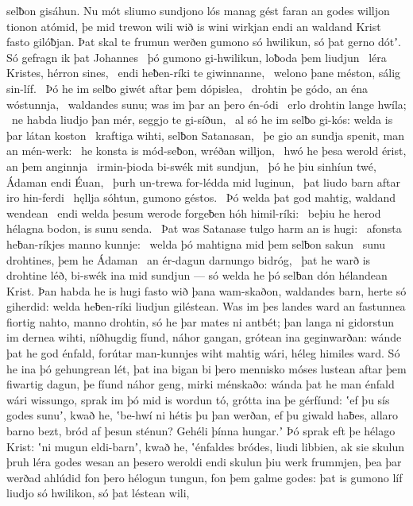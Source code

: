 selƀon gisáhun. Nu mót sliumo sundjono lós
manag gést faran an godes willjon
tionon atómid, þe mid trewon wili
wið is wini wirkjan endi an waldand Krist
fasto gilóƀjan. Þat skal te frumun werðen
gumono só hwilikun, só þat gerno dótʼ.
Só gefragn ik þat Johannes \hld\ þó gumono gi-hwilikun,
loƀoda þem liudjun \hld\ léra Kristes,
hérron sines, \hld\ endi heƀen-ríki
te giwinnanne, \hld\ welono þane méston,
sálig sin-líf. \hld\ Þó he im selƀo giwét
aftar þem dópislea, \hld\ drohtin þe gódo,
an éna wóstunnja, \hld\ waldandes sunu;
was im þar an þero én-ódi \hld\ erlo drohtin
lange hwíla; \hld\ ne habda liudjo þan mér,
seggjo te gi-síðun, \hld\ al só he im selƀo gi-kós:
welda is þar látan koston \hld\ kraftiga wihti,
selƀon Satanasan, \hld\ þe gio an sundja spenit,
man an mén-werk: \hld\ he konsta is mód-seƀon,
wréðan willjon, \hld\ hwó he þesa werold érist,
an þem anginnja \hld\ irmin-þioda
bi-swék mit sundjun, \hld\ þó he þiu sinhíun twé,
Ádaman endi Éuan, \hld\ þurh un-trewa
for-lédda mid luginun, \hld\ þat liudo barn
aftar iro hin-ferdi \hld\ hęllja sóhtun,
gumono géstos. \hld\ Þó welda þat god mahtig,
waldand wendean \hld\ endi welda þesum werode forgeƀen
hóh himil-ríki: \hld\ beþiu he herod hélagna bodon,
is sunu senda. \hld\ Þat was Satanase
tulgo harm an is hugi: \hld\ afonsta heƀan-ríkjes
manno kunnje: \hld\ welda þó mahtigna
mid þem selƀon sakun \hld\ sunu drohtines,
þem he Ádaman \hld\ an ér-dagun
darnungo bidróg, \hld\ þat he warð is drohtine léð,
bi-swék ina mid sundjun — só welda he þó selƀan dón
hélandean Krist. Þan habda he is hugi fasto
wið þana wam-skaðon, waldandes barn,
herte só giherdid: welda heƀen-ríki
liudjun giléstean. Was im þes landes ward
an fastunnea fiortig nahto,
manno drohtin, só he þar mates ni antbét;
þan langa ni gidorstun im dernea wihti,
níðhugdig fíund, náhor gangan,
grótean ina geginwarðan: wánde þat he god énfald,
forútar man-kunnjes wiht mahtig wári,
héleg himiles ward. Só he ina þó gehungrean lét,
þat ina bigan bi þero mennisko móses lustean
aftar þem fiwartig dagun, þe fíund náhor geng,
mirki ménskaðo: wánda þat he man énfald
wári wissungo, sprak im þó mid is wordun tó,
grótta ina þe gérfíund: ʽef þu sís godes sunuʼ, kwað he,
ʽbe-hwí ni hétis þu þan werðan, ef þu giwald haƀes,
allaro barno bezt, bród af þesun sténun?
Gehéli þínna hungar.ʼ Þó sprak eft þe hélago Krist:
ʽni mugun eldi-barnʼ, kwað he, ʽénfaldes bródes,
liudi libbien, ak sie skulun þruh léra godes
wesan an þesero weroldi endi skulun þiu werk frummjen,
þea þar werðad ahlúdid fon þero hélogun tungun,
fon þem galme godes: þat is gumono líf
liudjo só hwilikon, só þat léstean wili,
